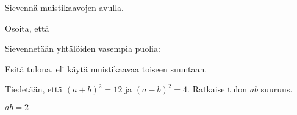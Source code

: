 \begin{tehtavasivu}
\begin{tehtava}
{    }
    \begin{vastaus}
    \end{vastaus}
\end{tehtava}

\begin{tehtava}
    Sievennä muistikaavojen avulla.
    \begin{vastaus}
    \end{vastaus}
\end{tehtava}

\begin{tehtava}
    Osoita, että
    \begin{vastaus}
    	Sievennetään yhtälöiden vasempia puolia:
    \end{vastaus}
\end{tehtava}

\begin{tehtava}
    Esitä tulona, eli käytä muistikaavaa toiseen suuntaan.
    \begin{vastaus}
    \end{vastaus}
\end{tehtava}

\begin{tehtava}
	Tiedetään, että $(a+b)^2=12$ ja $(a-b)^2=4$. Ratkaise tulon $ab$ suuruus.
    \begin{vastaus}
	$ab = 2$
    \end{vastaus}
\end{tehtava}


\end{tehtavasivu}
